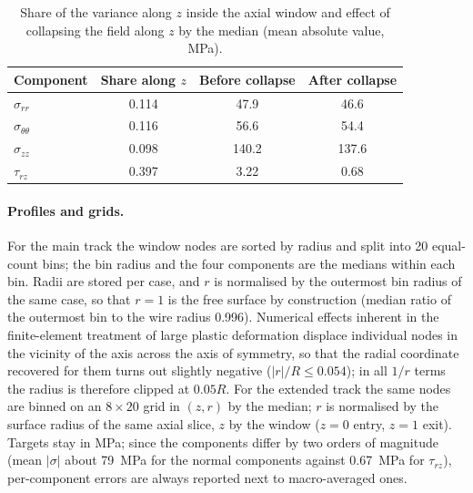 \documentclass[subscriptcorrection,upint,varvw,barcolor=Goldenrod3,mathalfa=cal=euler,balance,hyphenate,french,pdf-a]{asmejour} %
\begin{document}
\begin{table}[htbp]
\centering\small
\caption{Share of the variance along $z$ inside the axial window and effect of collapsing the field along $z$ by the median (mean absolute value, MPa).} %
\label{tab:zshare}
\begin{tabular}{@{}lccc@{}}
\toprule
Component & Share along $z$ & Before collapse & After collapse \\
\midrule
$\sigma_{rr}$           & 0.114 & 47.9  & 46.6  \\ %
$\sigma_{\theta\theta}$ & 0.116 & 56.6  & 54.4  \\ %
$\sigma_{zz}$           & 0.098 & 140.2 & 137.6 \\ %
$\tau_{rz}$             & 0.397 & 3.22  & 0.68  \\ %
\bottomrule
\end{tabular}
\end{table}

\paragraph{Profiles and grids.}
For the main track the window nodes are sorted by radius and split into 20 equal-count bins; the bin radius and the four components are the medians within each bin. %
Radii are stored per case, and $r$ is normalised by the outermost bin radius of the same case, so that $r=1$ is the free surface by construction (median ratio of the outermost bin to the wire radius 0.996). %
Numerical effects inherent in the finite-element treatment of large plastic deformation displace individual nodes in the vicinity of the axis across the axis of symmetry, so that the radial coordinate recovered for them turns out slightly negative ($|r|/R \le 0.054$); in all $1/r$ terms the radius is therefore clipped at $0.05R$. %
For the extended track the same nodes are binned on an $8\times20$ grid in $(z,r)$ by the median; $r$ is normalised by the surface radius of the same axial slice, $z$ by the window ($z=0$ entry, $z=1$ exit). %
Targets stay in MPa; since the components differ by two orders of magnitude (mean $|\sigma|$ about 79~MPa for the normal components against 0.67~MPa for $\tau_{rz}$), per-component errors are always reported next to macro-averaged ones. %
\end{document}
